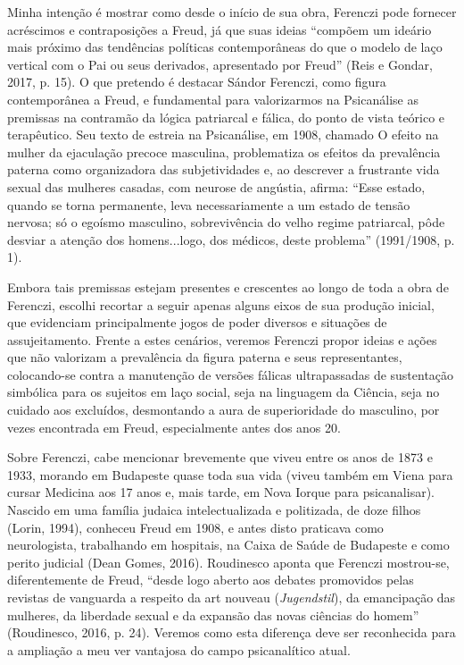 Minha intenção é mostrar como desde o início de sua obra, Ferenczi pode
fornecer acréscimos e contraposições a Freud, já que suas ideias
``compõem um ideário mais próximo das tendências políticas
contemporâneas do que o modelo de laço vertical com o Pai ou seus
derivados, apresentado por Freud'' (Reis e Gondar, 2017, p. 15). O que
pretendo é destacar Sándor Ferenczi, como figura contemporânea a Freud,
e fundamental para valorizarmos na Psicanálise as premissas na contramão
da lógica patriarcal e fálica, do ponto de vista teórico e terapêutico.
Seu texto de estreia na Psicanálise, em 1908, chamado O efeito na mulher
da ejaculação precoce masculina, problematiza os efeitos da prevalência
paterna como organizadora das subjetividades e, ao descrever a
frustrante vida sexual das mulheres casadas, com neurose de angústia,
afirma: ``Esse estado, quando se torna permanente, leva necessariamente
a um estado de tensão nervosa; só o egoísmo masculino, sobrevivência do
velho regime patriarcal, pôde desviar a atenção dos homens...logo, dos
médicos, deste problema'' (1991/1908, p. 1).

Embora tais premissas estejam presentes e crescentes ao longo de toda a
obra de Ferenczi, escolhi recortar a seguir apenas alguns eixos de sua
produção inicial, que evidenciam principalmente jogos de poder diversos
e situações de assujeitamento. Frente a estes cenários, veremos Ferenczi
propor ideias e ações que não valorizam a prevalência da figura paterna
e seus representantes, colocando-se contra a manutenção de versões
fálicas ultrapassadas de sustentação simbólica para os sujeitos em laço
social, seja na linguagem da Ciência, seja no cuidado aos excluídos,
desmontando a aura de superioridade do masculino, por vezes encontrada
em Freud, especialmente antes dos anos 20.

Sobre Ferenczi, cabe mencionar brevemente que viveu entre os anos de
1873 e 1933, morando em Budapeste quase toda sua vida (viveu também em
Viena para cursar Medicina aos 17 anos e, mais tarde, em Nova Iorque
para psicanalisar). Nascido em uma família judaica intelectualizada e
politizada, de doze filhos (Lorin, 1994), conheceu Freud em 1908, e
antes disto praticava como neurologista, trabalhando em hospitais, na
Caixa de Saúde de Budapeste e como perito judicial (Dean Gomes, 2016).
Roudinesco aponta que Ferenczi mostrou-se, diferentemente de Freud,
``desde logo aberto aos debates promovidos pelas revistas de vanguarda a
respeito da art nouveau (\emph{Jugendstil}), da emancipação das
mulheres, da liberdade sexual e da expansão das novas ciências do
homem'' (Roudinesco, 2016, p. 24). Veremos como esta diferença deve ser
reconhecida para a ampliação a meu ver vantajosa do campo psicanalítico
atual.

